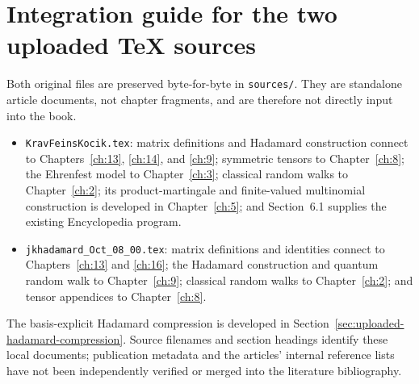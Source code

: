 \section*{Integration guide for the two uploaded TeX sources}
Both original files are preserved byte-for-byte in \texttt{sources/}.
They are standalone article documents, not chapter fragments, and are
therefore not directly input into the book.
\begin{itemize}
\item \texttt{KravFeinsKocik.tex}: matrix definitions and Hadamard
construction connect to Chapters~\ref{ch:13}, \ref{ch:14}, and \ref{ch:9};
symmetric tensors to Chapter~\ref{ch:8}; the Ehrenfest model to
Chapter~\ref{ch:3}; classical random walks to Chapter~\ref{ch:2};
its product-martingale and finite-valued multinomial construction is developed in Chapter~\ref{ch:5};
and Section~6.1 supplies the existing Encyclopedia program.
\item \texttt{jkhadamard\_Oct\_08\_00.tex}: matrix definitions and
identities connect to Chapters~\ref{ch:13} and \ref{ch:16}; the Hadamard
construction and quantum random walk to Chapter~\ref{ch:9}; classical
random walks to Chapter~\ref{ch:2}; and tensor appendices to
Chapter~\ref{ch:8}.
\end{itemize}
The basis-explicit Hadamard compression is developed in
Section~\ref{sec:uploaded-hadamard-compression}. Source filenames and
section headings identify these local documents; publication metadata
and the articles' internal reference lists have not been independently
verified or merged into the literature bibliography.
